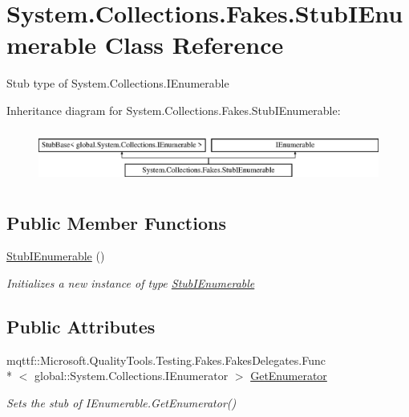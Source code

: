 \hypertarget{class_system_1_1_collections_1_1_fakes_1_1_stub_i_enumerable}{\section{System.\-Collections.\-Fakes.\-Stub\-I\-Enumerable Class Reference}
\label{class_system_1_1_collections_1_1_fakes_1_1_stub_i_enumerable}
}


Stub type of System.\-Collections.\-I\-Enumerable 


Inheritance diagram for System.\-Collections.\-Fakes.\-Stub\-I\-Enumerable\-:\begin{figure}[H]
\begin{center}
\leavevmode
\includegraphics[height=1.777778cm]{class_system_1_1_collections_1_1_fakes_1_1_stub_i_enumerable}
\end{center}
\end{figure}
\subsection*{Public Member Functions}
\begin{DoxyCompactItemize}
\item 
\hyperlink{class_system_1_1_collections_1_1_fakes_1_1_stub_i_enumerable_a8a01c8e8f35b745e32efd3757716dc0d}{Stub\-I\-Enumerable} ()
\begin{DoxyCompactList}\small\item\em Initializes a new instance of type \hyperlink{class_system_1_1_collections_1_1_fakes_1_1_stub_i_enumerable}{Stub\-I\-Enumerable}\end{DoxyCompactList}\end{DoxyCompactItemize}
\subsection*{Public Attributes}
\begin{DoxyCompactItemize}
\item 
mqttf\-::\-Microsoft.\-Quality\-Tools.\-Testing.\-Fakes.\-Fakes\-Delegates.\-Func\\*
$<$ global\-::\-System.\-Collections.\-I\-Enumerator $>$ \hyperlink{class_system_1_1_collections_1_1_fakes_1_1_stub_i_enumerable_ab90a01e7cc89109150167aa424175e51}{Get\-Enumerator}
\begin{DoxyCompactList}\small\item\em Sets the stub of I\-Enumerable.\-Get\-Enumerator()\end{DoxyCompactList}\end{DoxyCompactItemize}


